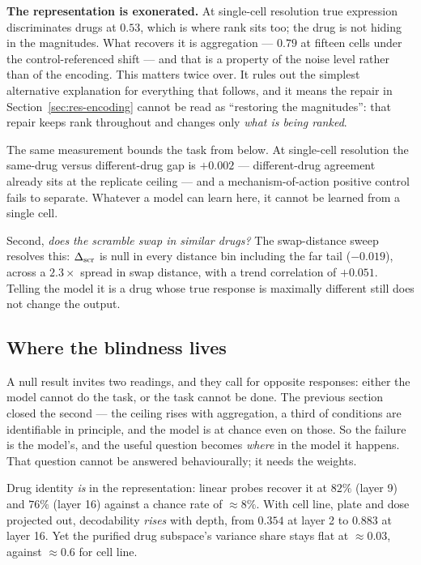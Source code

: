 \textbf{The representation is exonerated.} At single-cell resolution true expression discriminates
drugs at $0.53$, which is where rank sits too; the drug is not hiding in the magnitudes. What
recovers it is aggregation --- $0.79$ at fifteen cells under the control-referenced shift --- and that
is a property of the noise level rather than of the encoding. This matters twice over. It rules out
the simplest alternative explanation for everything that follows, and it means the repair in
Section~\ref{sec:res-encoding} cannot be read as ``restoring the magnitudes'': that repair keeps rank
throughout and changes only \emph{what is being ranked}.

The same measurement bounds the task from below. At single-cell resolution the same-drug versus
different-drug gap is $+0.002$ --- different-drug agreement already sits at the replicate ceiling ---
and a mechanism-of-action positive control fails to separate. Whatever a model can learn here, it
cannot be learned from a single cell.

Second, \emph{does the scramble swap in similar drugs?} The swap-distance sweep resolves this:
$\Delta_{\textrm{scr}}$ is null in every distance bin including the far tail ($-0.019$), across a $2.3\times$ spread
in swap distance, with a trend correlation of $+0.051$. Telling the model it is a drug whose true
response is maximally different still does not change the output.

\subsection{Where the blindness lives}
\label{sec:res-mechanism}

A null result invites two readings, and they call for opposite responses: either the model cannot do
the task, or the task cannot be done. The previous section closed the second --- the ceiling rises
with aggregation, a third of conditions are identifiable in principle, and the model is at chance
even on those. So the failure is the model's, and the useful question becomes \emph{where} in the
model it happens. That question cannot be answered behaviourally; it needs the weights.

Drug identity \emph{is} in the representation: linear probes recover it at $82\%$ (layer 9) and
$76\%$ (layer 16) against a chance rate of $\approx 8\%$. With cell line, plate and dose projected
out, decodability \emph{rises} with depth, from $0.354$ at layer 2 to $0.883$ at layer 16. Yet the
purified drug subspace's variance share stays flat at $\approx 0.03$, against $\approx 0.6$ for cell
line.

